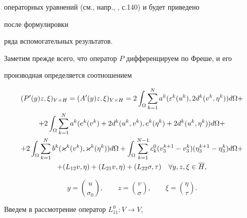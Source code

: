 операторных уравнений (см., напр., \cite{Kra}, с.140) и будет приведено


после формулировки 


ряда вспомогательных результатов.





Заметим прежде всего, что оператор $P$ дифференцируем по Фреше, и его


производная определяется соотношением


\begin{gather}


\label{P'}


(P'(y)z, \xi )_{V \times H} = 


(A'(y)z, \xi )_{V \times H} = 2 \int _{\Omega } \sum ^{N}_{k=1} a^{k}


(\varepsilon ^{k}(u^{k}),2d^{k}(v^{k},\eta ^{k})) d\Omega +\notag \\


%


+ 2\int _{\Omega } \sum ^{N}_{k=1} 


a^{k}(e^{k}(v^{k})+2d^{k}(u^{k},v^{k}),e^{k}(\eta 


^{k})+2d^{k}(u^{k},\eta ^{k})) d\Omega +\notag\\


%


+ 2\int _{\Omega } \sum ^{N}_{k=1} b^{k}(\varkappa ^{k}(v^{k}),


\varkappa ^{k}(\eta ^{k})) d\Omega 


+ \int _{\Omega }\sum ^{N-1}_{k=1} c_k^0


(v^{k+1}_{3} - v^{k}_{3})(\eta ^{k+1}_{3} - \eta ^{k}_{3})


 d\Omega+\notag\\


+ (L_{12}v,\eta ) + (L_{21}v,\eta ) 


+ (L_{22}\sigma ,\tau ) \quad \forall y,


z, \xi \in \overline H ,


\end{gather}


$$


y = \binom{u}{\sigma_0 }, \qquad


z = \binom{v}{\sigma }, \qquad


\xi = \binom{\eta}{\tau }.


$$





Введем в рассмотрение оператор $ L^{0}_{11}:V \to V $,


